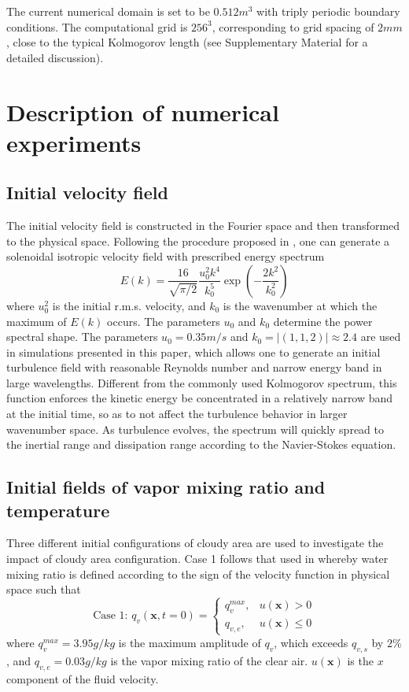 \documentclass[draft,linenumbers]{agujournal}
\begin{document}
The current numerical domain is set to be $0.512m^{3}$ with triply periodic boundary conditions. The computational grid is $256^{3}$, corresponding to grid spacing of $2mm$, close to the typical Kolmogorov length {\color{green}(see Supplementary Material for a detailed discussion)}.

\section{Description of numerical experiments}\label{experiment_description}

\subsection{Initial velocity field}   
The initial velocity field is constructed in the Fourier space and then transformed to the physical space. Following the procedure proposed in \citet{Rogallo81}, one can generate a solenoidal isotropic velocity field with prescribed energy spectrum \citep{Rosales05}
\begin{equation}
E(k) = \frac{16}{\sqrt{\pi/2}}\frac{u_0^2k^4}{k_0^5}\exp(-\frac{2k^2}{k_0^2})
\end{equation}
where $u_0^2$ is the initial r.m.s. velocity, and $k_0$ is the wavenumber at which the maximum of $E(k)$ occurs. The parameters $u_0$ and $k_0$ determine the power spectral shape. {\color{green}The parameters $u_0 = 0.35m/s$ and $k_0 = |(1,1,2)| \approx 2.4$ are used in simulations presented in this paper, which allows one to generate an initial turbulence field with reasonable Reynolds number and narrow energy band in large wavelengths.} Different from the commonly used Kolmogorov spectrum, this function enforces the kinetic energy be concentrated in a relatively narrow band at the initial time, so as to not affect the turbulence behavior in larger wavenumber space. As turbulence evolves, the spectrum will quickly spread to the inertial range and dissipation range according to the Navier-Stokes equation.

\subsection{Initial fields of vapor mixing ratio and temperature}
Three different initial configurations of cloudy area are used to investigate the impact of cloudy area configuration. Case 1 follows that used in \citet{And04} whereby water mixing ratio is defined according to the sign of the velocity function in physical space such that
\begin{equation}
\mbox{Case 1: } q_v(\mathbf{x},t=0) = 
\left\{\begin{array}{lr}
q_v^{max}, & u(\mathbf{x}) > 0\\
q_{v,e}, & u(\mathbf{x}) \le 0
\end{array}\right.\label{case1}
\end{equation}
where $q_v^{max} = 3.95 g/kg$ is the maximum amplitude of $q_v$, which exceeds $q_{v,s}$ by $2\%$, and $q_{v,e} = 0.03g/kg$ is the vapor mixing ratio of the clear air. $u(\mathbf{x})$ is the $x$ component of the fluid velocity. 
\end{document}
